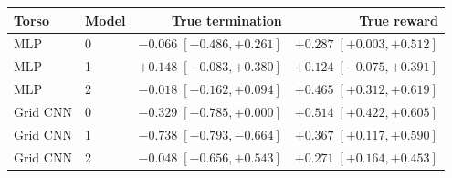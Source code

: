 \begin{tabular}{llrr}
\toprule
\rowcolor{Navy!8}
Torso & Model & True termination & True reward \\
\midrule
MLP & 0 & $-0.066\;[-0.486,+0.261]$ & $+0.287\;[+0.003,+0.512]$ \\
MLP & 1 & $+0.148\;[-0.083,+0.380]$ & $+0.124\;[-0.075,+0.391]$ \\
MLP & 2 & $-0.018\;[-0.162,+0.094]$ & $+0.465\;[+0.312,+0.619]$ \\
\midrule
Grid CNN & 0 & $-0.329\;[-0.785,+0.000]$ & $+0.514\;[+0.422,+0.605]$ \\
Grid CNN & 1 & $-0.738\;[-0.793,-0.664]$ & $+0.367\;[+0.117,+0.590]$ \\
Grid CNN & 2 & $-0.048\;[-0.656,+0.543]$ & $+0.271\;[+0.164,+0.453]$ \\
\bottomrule
\end{tabular}
